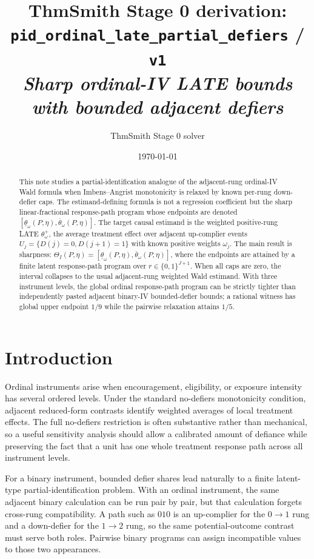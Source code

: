 \documentclass[11pt]{article}
\title{ThmSmith Stage 0 derivation: \texttt{pid\_ordinal\_late\_partial\_defiers} / \texttt{v1}%
  \\ \large\textit{Sharp ordinal-IV LATE bounds with bounded adjacent defiers}}
\author{ThmSmith Stage 0 solver}
\date{\today}
\theoremstyle{definition}
\theoremstyle{plain}
\theoremstyle{remark}
\begin{document}
\maketitle


\begin{abstract}
This note studies a partial-identification analogue of the adjacent-rung
ordinal-IV Wald formula when Imbens--Angrist monotonicity is relaxed by known
per-rung down-defier caps.  The estimand-defining formula is not a regression
coefficient but the sharp linear-fractional response-path program whose
endpoints are denoted
\([\underline\theta_\omega(P,\eta),\overline\theta_\omega(P,\eta)]\).  The
target causal estimand is the weighted positive-rung LATE
\(\theta^+_\omega\), the average treatment effect over adjacent up-complier
events \(U_j=\{D(j)=0,D(j+1)=1\}\) with known positive weights \(\omega_j\).
The main result is sharpness:
\(\Theta_I(P,\eta)=[\underline\theta_\omega(P,\eta),
\overline\theta_\omega(P,\eta)]\), where the endpoints are attained by a
finite latent response-path program over \(r\in\{0,1\}^{J+1}\).  When all caps
are zero, the interval collapses to the usual adjacent-rung weighted Wald
estimand.  With three instrument levels, the global ordinal response-path
program can be strictly tighter than independently pasted adjacent binary-IV
bounded-defier bounds; a rational witness has global upper endpoint \(1/9\)
while the pairwise relaxation attains \(1/5\).
\end{abstract}

\section{Introduction}
Ordinal instruments arise when encouragement, eligibility, or exposure
intensity has several ordered levels.  Under the standard no-defiers
monotonicity condition, adjacent reduced-form contrasts identify weighted
averages of local treatment effects.  The full no-defiers restriction is often
substantive rather than mechanical, so a useful sensitivity analysis should
allow a calibrated amount of defiance while preserving the fact that a unit has
one whole treatment response path across all instrument levels.

For a binary instrument, bounded defier shares lead naturally to a finite
latent-type partial-identification problem.  With an ordinal instrument, the
same adjacent binary calculation can be run pair by pair, but that calculation
forgets cross-rung compatibility.  A path such as \(010\) is an up-complier for
the \(0\to1\) rung and a down-defier for the \(1\to2\) rung, so the same
potential-outcome contrast must serve both roles.  Pairwise binary programs can
assign incompatible values to those two appearances.
\end{document}

